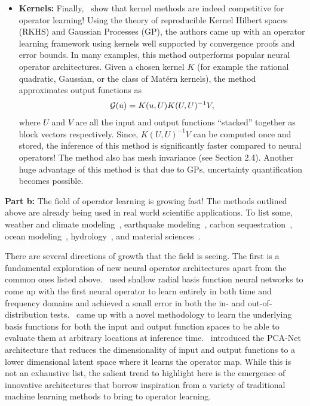 \begin{itemize}
\item {\bf Kernels:} Finally,~\citep{batlle2024kernel} show that kernel methods are indeed competitive for operator learning! Using the theory of reproducible Kernel Hilbert spaces (RKHS) and Gaussian Processes (GP), the authors came up with an operator learning framework using kernels well supported by convergence proofs and error bounds. In many examples, this method outperforms popular neural operator architectures. Given a chosen kernel $K$ (for example the rational quadratic, Gaussian, or the class of Mat\'ern kernels), the method approximates output functions as
\begin{align}
\mathcal{G}(u) = K(u, U) K(U, U)^{-1} V,
\end{align}
where $U$ and $V$ are all the input and output functions ``stacked'' together as block vectors respectively. Since, $K(U, U)^{-1} V$ can be computed once and stored, the inference of this method is significantly faster compared to neural operators! The method also has mesh invariance (see Section 2.4). Another huge advantage of this method is that due to GPs, uncertainty quantification becomes possible.
\end{itemize}

{\bf Part b:} The field of operator learning is growing fast! The methods outlined above are already being used in real world scientific applications. To list some, weather and climate modeling~\citep{bora2023learning, pathak2022fourcastnet, jiang2023efficient, yang2024fourier}, earthquake modeling~\citep{haghighat2024deeponet}, carbon sequestration~\citep{lee2024efficient}, ocean modeling~\citep{choi2024applications}, hydrology~\citep{sun2024bridging}, and material sciences~\citep{gupta2022towards, oommen2024rethinking}.

There are several directions of growth that the field is seeing. The first is a fundamental exploration of new neural operator architectures apart from the common ones listed above.~\citep{kurz2024radial} used shallow radial basis function neural networks to come up with the first neural operator to learn entirely in both time and frequency domains and achieved a small error in both the in- and out-of-distribution tests.~\citep{ingebrand2025basis} came up with a novel methodology to learn the underlying basis functions for both the input and output function spaces to be able to evaluate them at arbitrary locations at inference time.~\citep{bhattacharya2021model} introduced the PCA-Net architecture that reduces the dimensionality of input and output functions to a lower dimensional latent space where it learns the operator map. While this is not an exhaustive list, the salient trend to highlight here is the emergence of innovative architectures that borrow inspiration from a variety of traditional machine learning methods to bring to operator learning.

